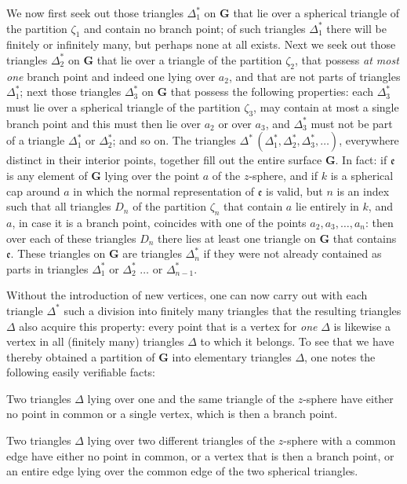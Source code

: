 \documentclass{article}
\begin{document}
We now first seek out those triangles $\Delta_1^*$ on $\mathbf{G}$ that lie over a spherical triangle of the partition $\zeta_1$ and contain no branch point; of such triangles $\Delta_1^*$ there will be finitely or infinitely many, but perhaps none at all exists. Next we seek out those triangles $\Delta_2^*$ on $\mathbf{G}$ that lie over a triangle of the partition $\zeta_2$, that possess \emph{at most one} branch point and indeed one lying over $a_2$, and that are not parts of triangles $\Delta_1^*$; next those triangles $\Delta_3^*$ on $\mathbf{G}$ that possess the following properties: each $\Delta_3^*$ must lie over a spherical triangle of the partition $\zeta_3$, may contain at most a single branch point and this must then lie over $a_2$ or over $a_3$, and $\Delta_3^*$ must not be part of a triangle $\Delta_1^*$ or $\Delta_2^*$; and so on. The triangles $\Delta^*\,(\Delta_1^*, \Delta_2^*, \Delta_3^*, \dots)$, everywhere distinct in their interior points, together fill out the entire surface $\mathbf{G}$. In fact: if $\mathfrak{e}$ is any element of $\mathbf{G}$ lying over the point $a$ of the $z$-sphere, and if $k$ is a spherical cap around $a$ in which the normal representation of $\mathfrak{e}$ is valid, but $n$ is an index such that all triangles $D_n$ of the partition $\zeta_n$ that contain $a$ lie entirely in $k$, and $a$, in case it is a branch point, coincides with one of the points $a_2, a_3, \dots, a_n$: then over each of these triangles $D_n$ there lies at least one triangle on $\mathbf{G}$ that contains $\mathfrak{e}$. These triangles on $\mathbf{G}$ are triangles $\Delta_n^*$ if they were not already contained as parts in triangles $\Delta_1^*$ or $\Delta_2^*$ $\dots$ or $\Delta_{n-1}^*$.

Without the introduction of new vertices, one can now carry out with each triangle $\Delta^*$ such a division into finitely many triangles that the resulting triangles $\Delta$ also acquire this property: every point that is a vertex for \emph{one} $\Delta$ is likewise a vertex in all (finitely many) triangles $\Delta$ to which it belongs. To see that we have thereby obtained a partition of $\mathbf{G}$ into elementary triangles $\Delta$, one notes the following easily verifiable facts:

Two triangles $\Delta$ lying over one and the same triangle of the $z$-sphere have either no point in common or a single vertex, which is then a branch point.

Two triangles $\Delta$ lying over two different triangles of the $z$-sphere with a common edge have either no point in common, or a vertex that is then a branch point, or an entire edge lying over the common edge of the two spherical triangles.
\end{document}
